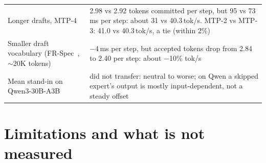 \documentclass[11pt]{article}
\newcommand{\tps}{\,tok/s}
\newcommand{\ms}{\,ms}
\begin{document}
\begin{table}[H]
\begin{tabularx}{\linewidth}{>{\raggedright\arraybackslash}p{4.6cm} L}
Longer drafts, MTP-4 & 2.98 vs 2.92 tokens committed per step, but 95 vs 73\ms{} per step: about 31 vs 40.3\tps. MTP-2 vs MTP-3: 41.0 vs 40.3\tps, a tie (within 2\%) \\
Smaller draft vocabulary (FR-Spec~\citep{frspec}, $\sim$20K tokens) & $-$4\ms{} per step, but accepted tokens drop from 2.84 to 2.40 per step: about $-$10\% tok/s \\
Mean stand-in on Qwen3-30B-A3B & did not transfer: neutral to worse; on Qwen a skipped expert's output is mostly input-dependent, not a steady offset \\
\bottomrule
\end{tabularx}
\end{table}

\section{Limitations and what is not measured}
\label{sec:limits}
\end{document}
